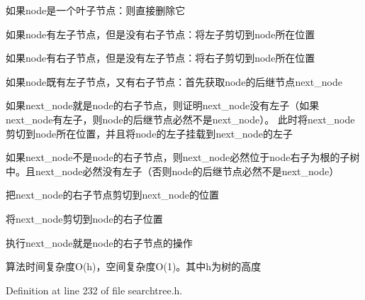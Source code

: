 \begin{DoxyItemize}
\item 如果{\ttfamily node}是一个叶子节点：则直接删除它
\item 如果{\ttfamily node}有左子节点，但是没有右子节点：将左子剪切到{\ttfamily node}所在位置
\item 如果{\ttfamily node}有右子节点，但是没有左子节点：将右子剪切到{\ttfamily node}所在位置
\item 如果{\ttfamily node}既有左子节点，又有右子节点：首先获取{\ttfamily node}的后继节点{\ttfamily next\+\_\+node}
\begin{DoxyItemize}
\item 如果{\ttfamily next\+\_\+node}就是{\ttfamily node}的右子节点，则证明{\ttfamily next\+\_\+node}没有左子（如果{\ttfamily next\+\_\+node}有左子，则{\ttfamily node}的后继节点必然不是{\ttfamily next\+\_\+node}）。 此时将{\ttfamily next\+\_\+node}剪切到{\ttfamily node}所在位置，并且将{\ttfamily node}的左子挂载到{\ttfamily next\+\_\+node}的左子
\item 如果{\ttfamily next\+\_\+node}不是{\ttfamily node}的右子节点，则{\ttfamily next\+\_\+node}必然位于{\ttfamily node}右子为根的子树中。且{\ttfamily next\+\_\+node}必然没有左子（否则{\ttfamily node}的后继节点必然不是{\ttfamily next\+\_\+node}）
\begin{DoxyItemize}
\item 把{\ttfamily next\+\_\+node}的右子节点剪切到{\ttfamily next\+\_\+node}的位置
\item 将{\ttfamily next\+\_\+node}剪切到{\ttfamily node}的右子位置
\item 执行{\ttfamily next\+\_\+node}就是{\ttfamily node}的右子节点的操作
\end{DoxyItemize}
\end{DoxyItemize}
\end{DoxyItemize}

算法时间复杂度\+O(h)，空间复杂度\+O(1)。其中h为树的高度 

Definition at line 232 of file searchtree.\+h.

\hypertarget{class_introduction_to_algorithm_1_1_tree_algorithm_1_1_search_tree_affaf44d28dc2180f93669cb8d6c09c84}{}
